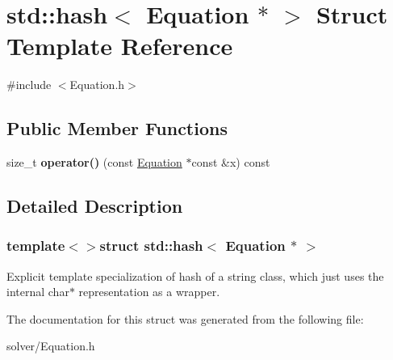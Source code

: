 \hypertarget{structstd_1_1hash_3_01Equation_01_5_01_4}{\section{std\-:\-:hash$<$ \-Equation $\ast$ $>$ \-Struct \-Template \-Reference}
\label{structstd_1_1hash_3_01Equation_01_5_01_4}
}


{\ttfamily \#include $<$\-Equation.\-h$>$}

\subsection*{\-Public \-Member \-Functions}
\begin{DoxyCompactItemize}
\item 
\hypertarget{structstd_1_1hash_3_01Equation_01_5_01_4_a4a530b22a22644cd1eaadb952d8451d1}{size\-\_\-t {\bfseries operator()} (const \hyperlink{classEquation}{\-Equation} $\ast$const \&x) const }\label{structstd_1_1hash_3_01Equation_01_5_01_4_a4a530b22a22644cd1eaadb952d8451d1}

\end{DoxyCompactItemize}


\subsection{\-Detailed \-Description}
\subsubsection*{template$<$$>$struct std\-::hash$<$ Equation $\ast$ $>$}

\-Explicit template specialization of hash of a string class, which just uses the internal char$\ast$ representation as a wrapper. 

\-The documentation for this struct was generated from the following file\-:\begin{DoxyCompactItemize}
\item 
solver/\-Equation.\-h\end{DoxyCompactItemize}

